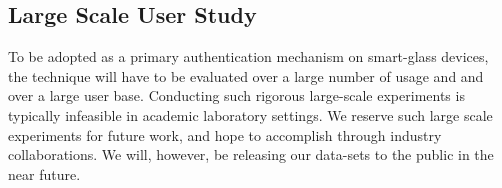 \subsection{Large Scale User Study}
To be adopted as a primary authentication mechanism on smart-glass devices,
the technique will have to be evaluated over a large number of usage and
and over a large user base. Conducting such rigorous large-scale experiments
is typically infeasible in academic laboratory settings. We reserve such
large scale experiments for future work, and hope to accomplish through
industry collaborations. We will, however, be releasing our data-sets to the 
public in the near future.